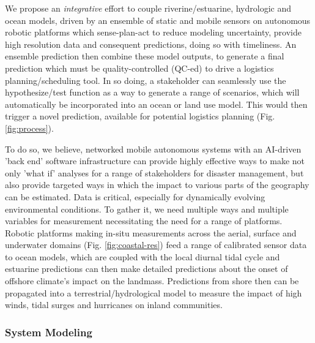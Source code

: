 We propose an \emph{integrative} effort to couple riverine/estuarine,
hydrologic and ocean models, driven by an ensemble of static and
mobile sensors on autonomous robotic platforms which sense-plan-act to
reduce modeling uncertainty, provide high resolution data and
consequent predictions, doing so with timeliness. %
An ensemble prediction then
combine these model outputs, to generate a final prediction which must
be quality-controlled (QC-ed) to drive a logistics planning/scheduling
tool. In so doing, a stakeholder can seamlessly use the
hypothesize/test function as a way to generate a range of scenarios,
which will automatically be incorporated into an ocean or land use
model. This would then trigger a novel prediction, available for
potential logistics planning (Fig. \ref{fig:process}).

To do so, we believe, networked mobile autonomous systems with an
AI-driven 'back end' software infrastructure can provide highly
effective ways to make not only 'what if' analyses for a range of
stakeholders for disaster management, but also provide targeted ways
in which the impact to various parts of the geography can be
estimated. Data is critical, especially for dynamically evolving
environmental conditions. To gather it, we need multiple ways and
multiple variables for measurement necessitating the need for a range
of platforms. Robotic platforms making in-situ measurements across the
aerial, surface and underwater domains (Fig. \ref{fig:coastal-res})
feed a range of calibrated sensor data to ocean models, which are
coupled with the local diurnal tidal cycle and estuarine predictions
can then make detailed predictions about the onset of offshore
climate's impact on the landmass. Predictions from shore then can be
propagated into a terrestrial/hydrological model to measure the impact
of high winds, tidal surges and hurricanes on inland communities.


\subsubsection*{System Modeling}


